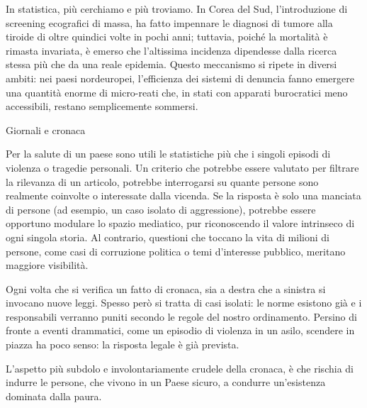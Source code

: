 \documentclass[12pt]{book} %
\begin{document}
In statistica, più cerchiamo e più troviamo. In Corea del Sud, l'introduzione di screening ecografici di massa, ha fatto impennare le diagnosi di tumore alla tiroide di oltre quindici volte in pochi anni; tuttavia, poiché la mortalità è rimasta invariata, è emerso che l'altissima incidenza dipendesse dalla ricerca stessa più che da una reale epidemia. Questo meccanismo si ripete in diversi ambiti: nei paesi nordeuropei, l'efficienza dei sistemi di denuncia fanno emergere una quantità enorme di micro-reati che, in stati con apparati burocratici meno accessibili, restano semplicemente sommersi.

\begin{mdframed}[linewidth=1pt]
Giornali e cronaca

Per la salute di un paese sono utili le statistiche più che i singoli episodi di violenza o tragedie personali. Un criterio che potrebbe essere valutato per filtrare la rilevanza di un articolo, potrebbe interrogarsi su quante persone sono realmente coinvolte o interessate dalla vicenda. Se la risposta è solo una manciata di persone (ad esempio, un caso isolato di aggressione), potrebbe essere opportuno modulare lo spazio mediatico, pur riconoscendo il valore intrinseco di ogni singola storia. Al contrario, questioni che toccano la vita di milioni di persone, come casi di corruzione politica o temi d'interesse pubblico, meritano maggiore visibilità.

Ogni volta che si verifica un fatto di cronaca, sia a destra che a sinistra si invocano nuove leggi. Spesso però si tratta di casi isolati: le norme esistono già e i responsabili verranno puniti secondo le regole del nostro ordinamento. Persino di fronte a eventi drammatici, come un episodio di violenza in un asilo, scendere in piazza ha poco senso: la risposta legale è già prevista. 

L’aspetto più subdolo e involontariamente crudele della cronaca, è che rischia di indurre le persone, che vivono in un Paese sicuro, a condurre un’esistenza dominata dalla paura.
\end{mdframed}
\end{document}
